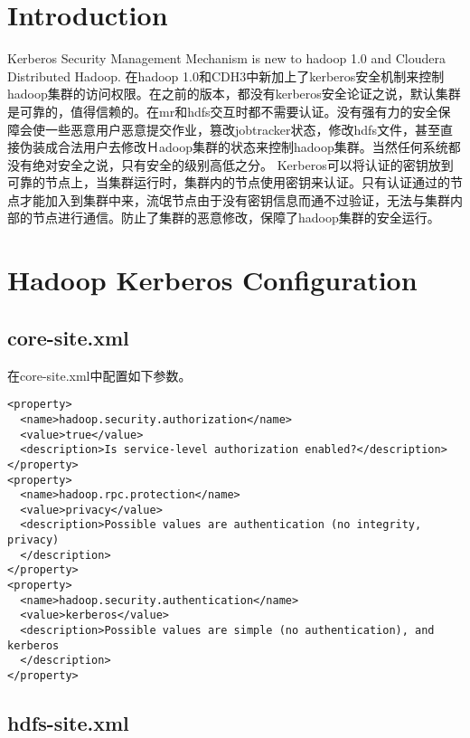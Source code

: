 \documentclass[a4paper,12pt]{article}
\begin{document}
\begin{CJK}{UTF8}{gbsn}

\section{Introduction}

    Kerberos Security Management Mechanism is new to hadoop 1.0 and Cloudera Distributed Hadoop.
在hadoop 1.0和CDH3中新加上了kerberos安全机制来控制hadoop集群的访问权限。在之前的版本，都没有kerberos安全论证之说，默认集群是可靠的，值得信赖的。在mr和hdfs交互时都不需要认证。没有强有力的安全保障会使一些恶意用户恶意提交作业，篡改jobtracker状态，修改hdfs文件，甚至直接伪装成合法用户去修改Ｈadoop集群的状态来控制hadoop集群。当然任何系统都没有绝对安全之说，只有安全的级别高低之分。
Kerberos可以将认证的密钥放到可靠的节点上，当集群运行时，集群内的节点使用密钥来认证。只有认证通过的节点才能加入到集群中来，流氓节点由于没有密钥信息而通不过验证，无法与集群内部的节点进行通信。防止了集群的恶意修改，保障了hadoop集群的安全运行。

\section{Hadoop Kerberos Configuration}

\subsection{core-site.xml}

在core-site.xml中配置如下参数。 　

\begin{verbatim}
<property>
  <name>hadoop.security.authorization</name>
  <value>true</value>
  <description>Is service-level authorization enabled?</description>
</property>
<property>
  <name>hadoop.rpc.protection</name>
  <value>privacy</value>
  <description>Possible values are authentication (no integrity, privacy)
  </description>
</property>
<property>
  <name>hadoop.security.authentication</name>
  <value>kerberos</value>
  <description>Possible values are simple (no authentication), and kerberos
  </description>
</property>
\end{verbatim}

\subsection{hdfs-site.xml}


\end{CJK}
\end{document}
